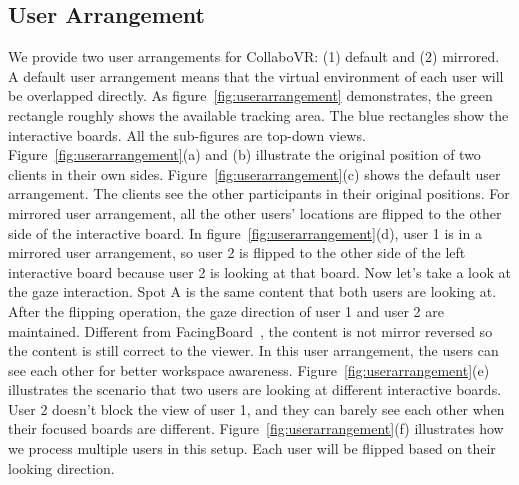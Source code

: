 \documentclass{sigchi}
\begin{document}
\subsection{User Arrangement}
We provide two user arrangements for CollaboVR: (1) default and (2) mirrored. A default user arrangement means that the virtual environment of each user will be overlapped directly. As figure~\ref{fig:userarrangement} demonstrates, the green rectangle roughly shows the available tracking area. The blue rectangles show the interactive boards. All the sub-figures are top-down views. Figure~\ref{fig:userarrangement}(a) and (b) illustrate the original position of two clients in their own sides. Figure~\ref{fig:userarrangement}(c) shows the default user arrangement. The clients see the other participants in their original positions. For mirrored user arrangement, all the other users' locations are flipped to the other side of the interactive board. In figure~\ref{fig:userarrangement}(d), user 1 is in a mirrored user arrangement, so user 2 is flipped to the other side of the left interactive board because user 2 is looking at that board. Now let's take a look at the gaze interaction. Spot A is the same content that both users are looking at. After the flipping operation, the gaze direction of user 1 and user 2 are maintained. Different from FacingBoard~\cite{li2014interactive}, the content is not mirror reversed so the content is still correct to the viewer. In this user arrangement, the users can see each other for better workspace awareness. Figure~\ref{fig:userarrangement}(e) illustrates the scenario that two users are looking at different interactive boards. User 2 doesn't block the view of user 1, and they can barely see each other when their focused boards are different. Figure~\ref{fig:userarrangement}(f) illustrates how we process multiple users in this setup. Each user will be flipped based on their looking direction.
\end{document}
